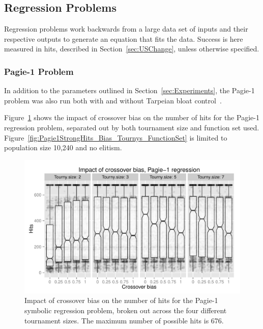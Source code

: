 \documentclass{sig-alternate}
\begin{document}
%
%
%
%


\subsection{Regression Problems}

Regression problems work backwards from a large data set of inputs and their respective outputs to generate an equation
that fits the data. Success is here measured in hits, described in Section~\ref{sec:USChange}, unless otherwise
specified.

\subsubsection{Pagie-1 Problem}

In addition to the parameters outlined in Section~\ref{sec:Experiments}, the Pagie-1 problem was also run both with and
without Tarpeian bloat control~\cite{poli2003simple}.

Figure~\ref{fig:Pagie1Hits_Bias_Tournys_FunctionSet} shows the impact of crossover bias on the number of hits for the
Pagie-1 regression problem, separated out by both tournament size and function set used. 
Figure~\ref{fig:Pagie1StrongHits_Bias_Tournys_FunctionSet} is limited  to population size 10,240
and no elitism.

\begin{figure}[tb]
\centering
\includegraphics[width=0.45 \textwidth]{Plots/Pagie_1_Hits_vs_Bias_Tournys.pdf}
\caption{Impact of crossover bias on the number of hits for the Pagie-1 symbolic regression problem, 
	broken out across the four different tournament sizes. The maximum number of possible hits is 676.}
\label{fig:Pagie1Hits_Bias_Tournys_FunctionSet}
\end{figure}
\end{document}
